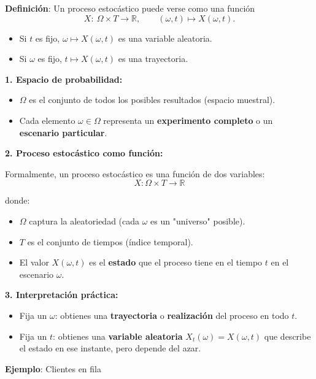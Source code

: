 \documentclass[12pt,a4paper]{article}
\begin{document}
\textbf{Definición}: Un proceso estocástico puede verse como una función
\begin{equation*}
X:\ \Omega \times T \longrightarrow \mathbb{R},\qquad (\omega,t)\mapsto X(\omega,t).
\end{equation*}
\begin{itemize}
    \item Si $t$ es fijo, $\omega \mapsto X(\omega,t)$ es una variable aleatoria.
    \item Si $\omega$ es fijo, $t \mapsto X(\omega,t)$ es una trayectoria.
\end{itemize}

\textbf{1. Espacio de probabilidad:}
\begin{itemize}
    \item $\Omega$ es el conjunto de todos los posibles resultados (espacio muestral).
    \item Cada elemento $\omega \in \Omega$ representa un \textbf{experimento completo} o un \textbf{escenario particular}.
\end{itemize}

\textbf{2. Proceso estocástico como función:}

Formalmente, un proceso estocástico es una función de dos variables:
\begin{equation*}
X : \Omega \times T \to \mathbb{R}
\end{equation*}

donde:
\begin{itemize}
    \item $\Omega$ captura la aleatoriedad (cada $\omega$ es un "universo" posible).
    \item $T$ es el conjunto de tiempos (índice temporal).
    \item El valor $X(\omega, t)$ es el \textbf{estado} que el proceso tiene en el tiempo $t$ en el escenario $\omega$.
\end{itemize}

\textbf{3. Interpretación práctica:}
\begin{itemize}
    \item Fija un $\omega$: obtienes una \textbf{trayectoria} o \textbf{realización} del proceso en todo $t$.
    \item Fija un $t$: obtienes una \textbf{variable aleatoria} $X_t(\omega) = X(\omega, t)$ que describe el estado en ese instante, pero depende del azar.
\end{itemize}

\textbf{Ejemplo}: Clientes en fila
\begin{center}
\end{center}
\end{document}
